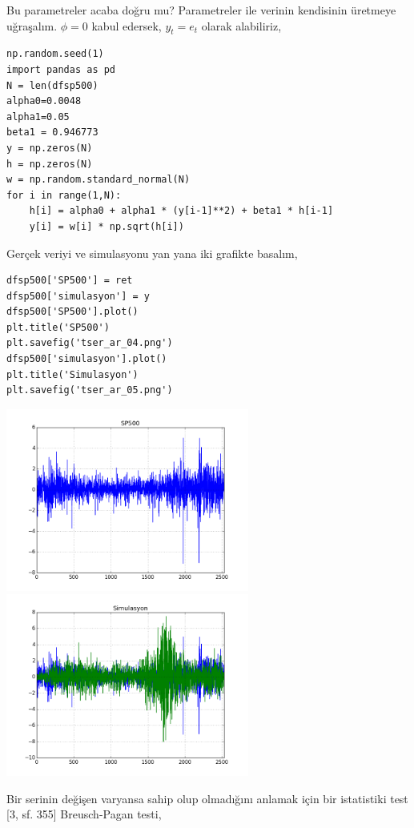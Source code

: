\documentclass[12pt,fleqn]{article}\usepackage{../../common}
\begin{document}
Bu parametreler acaba doğru mu? Parametreler ile verinin kendisinin
üretmeye uğraşalım. $\phi=0$ kabul edersek, $y_t = e_t$ olarak
alabiliriz, 

\begin{verbatim}
np.random.seed(1)
import pandas as pd
N = len(dfsp500)
alpha0=0.0048
alpha1=0.05
beta1 = 0.946773
y = np.zeros(N)
h = np.zeros(N)
w = np.random.standard_normal(N)
for i in range(1,N): 
    h[i] = alpha0 + alpha1 * (y[i-1]**2) + beta1 * h[i-1]
    y[i] = w[i] * np.sqrt(h[i])
\end{verbatim}

Gerçek veriyi ve simulasyonu yan yana iki grafikte basalım, 

\begin{verbatim}
dfsp500['SP500'] = ret
dfsp500['simulasyon'] = y
dfsp500['SP500'].plot()
plt.title('SP500')
plt.savefig('tser_ar_04.png')
dfsp500['simulasyon'].plot()
plt.title('Simulasyon')
plt.savefig('tser_ar_05.png')
\end{verbatim}

\includegraphics[height=6cm]{tser_ar_04.png}
\includegraphics[height=6cm]{tser_ar_05.png}

Bir serinin değişen varyansa sahip olup olmadığını anlamak için bir
istatistiki test [3, sf. 355] Breusch-Pagan testi, 
\end{document}
